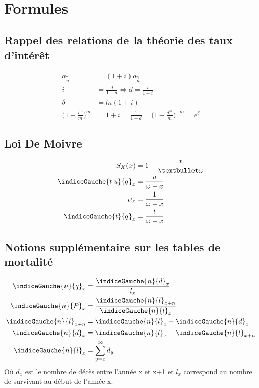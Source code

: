 \chapter{Formules}
\section{Rappel des relations de la théorie des taux d'intérêt}
\begin{align*}
\ddot{a}_{\annuity{n}} &= (1+i)a_{\annuity{n}}\\
i &= \frac{d}{1-d} \Leftrightarrow d = \frac{i}{1+i}\\
\delta &= ln(1+i) \\
\Bigg( 1+ \frac{i^m}{m}\Bigg)^m &= 1+i = \frac{1}{1 - d} = \Bigg( 1 - \frac{d^m}{m}\Bigg)^{-m} = e^{\delta}
\end{align*}
\section{Loi De Moivre}
\begin{align*}
S_X(x) &= 1 - \frac{x}{•\omega} \\
\indiceGauche{t|u}{q}_x &= \frac{u}{\omega - x} \\
\mu_x &= \frac{1}{\omega - x} \\
\indiceGauche{t}{q}_x &= \frac{t}{\omega - x}
\end{align*}
\section{Notions supplémentaire sur les tables de mortalité}
\begin{align*}
\indiceGauche{n}{q}_x &= \frac{\indiceGauche{n}{d}_x}{l_x} \\
\indiceGauche{n}{P}_x &= \frac{\indiceGauche{n}{l}_{x+n}}{\indiceGauche{n}{l}_x} \\
\indiceGauche{n}{l}_{x+n} &= \indiceGauche{n}{l}_{x} - \indiceGauche{n}{d}_{x} \\
\indiceGauche{n}{d}_{x} &= \indiceGauche{n}{l}_{x} - \indiceGauche{n}{l}_{x+n} \\
\indiceGauche{n}{l}_{x} &= \sum_{y=x}^{\infty} d_y
\end{align*}
Où $d_{x}$ est le nombre de décès entre l'année x et x+1 et $l_{x}$ correspond au nombre de survivant au début de l'année x.

